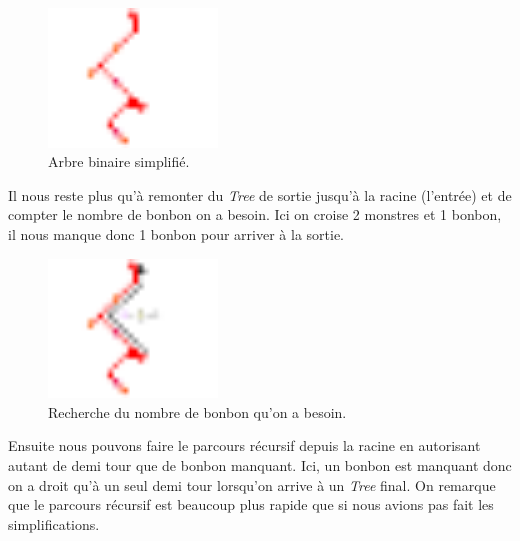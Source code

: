 \begin{figure}[!h]
\centering
\includegraphics[width=0.4\textwidth]{5.recherche/treeSimplification.pdf}
\caption{Arbre binaire simplifié.}
\end{figure}

Il nous reste plus qu'à remonter du \textit{Tree} de sortie jusqu'à la racine (l'entrée) et de compter le nombre de bonbon on a besoin. Ici on croise 2 monstres et 1 bonbon, il nous manque donc 1 bonbon pour arriver à la sortie.

\begin{figure}[!h]
\centering
\includegraphics[width=0.4\textwidth]{5.recherche/treeSearch.pdf}
\caption{Recherche du nombre de bonbon qu'on a besoin.}
\end{figure}

Ensuite nous pouvons faire le parcours récursif depuis la racine en autorisant autant de demi tour que de bonbon manquant. Ici, un bonbon est manquant donc on a droit qu'à un seul demi tour lorsqu'on arrive à un \textit{Tree} final. On remarque que le parcours récursif est beaucoup plus rapide que si nous avions pas fait les simplifications.